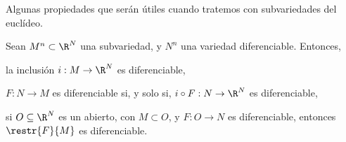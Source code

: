 Algunas propiedades que serán útiles cuando tratemos con subvariedades del euclídeo.
\begin{nprop}
  Sean $M^{n}\subset\R^{N}$ una subvariedad, y $N^{n}$ una variedad
  diferenciable. Entonces,
  \begin{nlist}
  \item \label{item:inc}
    la inclusión $i: M\to\R^{N}$ es diferenciable,
  \item \label{item:inc-2}
    $F: N\to M$ es diferenciable si, y solo si, $i\circ F: N\to\R^{N}$ es
    diferenciable,
  \item \label{item:restr-dif}
    si $O\subseteq\R^{N}$ es un abierto, con $M\subset O$, y $F: O\to N$ es
    diferenciable, entonces $\restr{F}{M}$ es diferenciable.
  \end{nlist}
\end{nprop}
